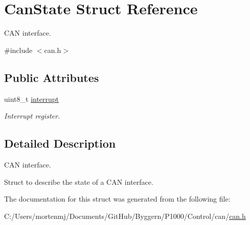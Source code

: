 \hypertarget{struct_can_state}{\section{Can\-State Struct Reference}
\label{struct_can_state}
}


C\-A\-N interface.  




{\ttfamily \#include $<$can.\-h$>$}

\subsection*{Public Attributes}
\begin{DoxyCompactItemize}
\item 
\hypertarget{struct_can_state_ad0cb6c55a5dead717e39d9d8b7ada358}{uint8\-\_\-t \hyperlink{struct_can_state_ad0cb6c55a5dead717e39d9d8b7ada358}{interrupt}}\label{struct_can_state_ad0cb6c55a5dead717e39d9d8b7ada358}

\begin{DoxyCompactList}\small\item\em Interrupt register. \end{DoxyCompactList}\end{DoxyCompactItemize}


\subsection{Detailed Description}
C\-A\-N interface. 

Struct to describe the state of a C\-A\-N interface. 

The documentation for this struct was generated from the following file\-:\begin{DoxyCompactItemize}
\item 
C\-:/\-Users/mortenmj/\-Documents/\-Git\-Hub/\-Byggern/\-P1000/\-Control/can/\hyperlink{can_8h}{can.\-h}\end{DoxyCompactItemize}
